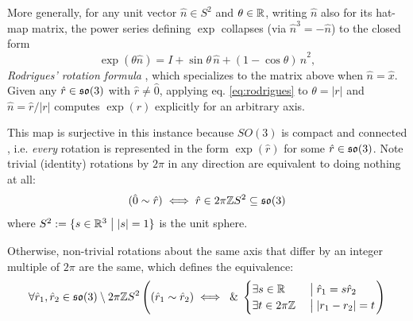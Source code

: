 \documentclass{amsart}
\theoremstyle{plain}
\theoremstyle{definition}
\begin{document}
    More generally, for any unit vector $\hat n\in S^2$ and $\theta\in\mathbb{R}$, writing $\hat n$ also for its hat-map matrix, the power series defining $\exp$ collapses (via $\hat n^3=-\hat n$) to the closed form
    \begin{equation}\label{eq:rodrigues}
        \exp(\theta\hat n) = I + \sin\theta\,\hat n + (1-\cos\theta)\,\hat n^2,
    \end{equation}
    \emph{Rodrigues' rotation formula} \cite{rodrigues1840}, which specializes to the matrix above when $\hat n=\hat x$. Given any $\hat r\in\mathfrak{so}(3)$ with $\hat r\neq\hat 0$, applying eq. \ref{eq:rodrigues} to $\theta=|r|$ and $\hat n=\hat r/|r|$ computes $\exp(\hat r)$ explicitly for an arbitrary axis.
    
    This map is surjective in this instance because $SO(3)$ is compact and connected \cite[Cor. 11.10]{hall}, i.e. \emph{every} rotation is represented in the form $\exp(\hat{r})$ for some $\hat{r}\in \mathfrak{so}(3)$.
    Note trivial (identity) rotations by $2\pi$ in any direction are equivalent to doing nothing at all:
    \begin{equation}
        (\hat{0} \sim \hat{r})\iff \hat{r} \in 2\pi\mathbb{Z} S^2\subseteq \mathfrak{so}(3)
    \end{equation}
    where $S^2:=\{s\in \mathbb{R}^3\hspace{1mm}\big|\hspace{1mm} |s| = 1\}$ is the unit sphere.
    
    Otherwise, non-trivial rotations about the same axis that differ by an integer multiple of $2\pi$ are the same, which defines the equivalence:
    \begin{equation}
       \forall \hat{r}_1, \hat{r}_2\in\mathfrak{so}(3)\setminus2\pi\mathbb{Z} S^2 \left((\hat{r}_1\sim \hat{r}_2)\iff\hspace{1mm}\mathrm{\&}\hspace{1mm}
       \begin{cases}
       \exists s\in \mathbb{R}&\hspace{1mm}\big|\hspace{1mm}\hat{r}_1=s\hat{r}_2\\
       \exists t\in 2\pi\mathbb{Z}&\hspace{1mm}\big|\hspace{1mm}|r_1-r_2|=t
       \end{cases}
       \right)
    \end{equation}
    
\end{document}
